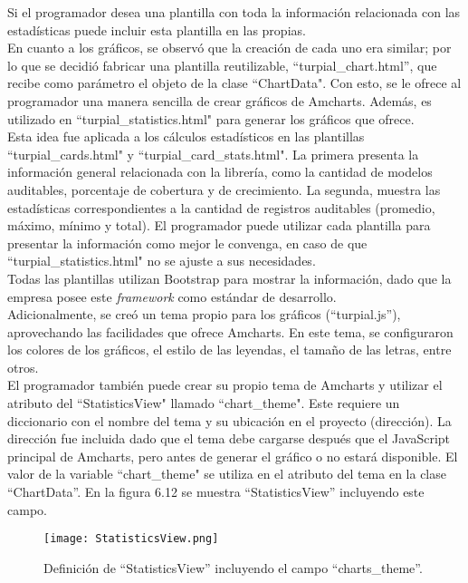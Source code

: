 Si el programador desea una plantilla con toda la información relacionada con las estadísticas puede incluir esta plantilla en las propias.\\

En cuanto a los gráficos, se observó que la creación de cada uno era similar; por lo que se decidió fabricar una plantilla reutilizable, “turpial\_chart.html”, que recibe como parámetro el objeto de la clase “ChartData". Con esto, se le ofrece al programador una manera sencilla de crear gráficos de Amcharts. Además, es utilizado en “turpial\_statistics.html" para generar los gráficos que ofrece. \\

Esta idea fue aplicada a los cálculos estadísticos en las plantillas “turpial\_cards.html" y “turpial\_card\_stats.html". La primera presenta  la información general relacionada con la librería, como la cantidad de modelos auditables, porcentaje de cobertura y de crecimiento. La segunda, muestra las estadísticas correspondientes a la cantidad de registros auditables (promedio, máximo, mínimo y total). El programador puede utilizar cada plantilla para presentar la información como mejor le convenga, en caso de que “turpial\_statistics.html" no se ajuste a sus necesidades.\\

Todas las plantillas utilizan Bootstrap para mostrar la información, dado que la empresa posee este \textit{framework} como estándar de desarrollo.\\

Adicionalmente, se creó un tema propio para los gráficos (“turpial.js”), aprovechando las facilidades que ofrece Amcharts. En este tema, se configuraron los colores de los gráficos, el estilo de las leyendas, el tamaño de las letras, entre otros.\\

El programador también puede crear su propio tema de Amcharts y utilizar el atributo del “StatisticsView" llamado “chart\_theme". Este requiere un diccionario con el nombre del tema y su ubicación en el proyecto (dirección). La dirección fue incluida dado que el tema debe cargarse después que el JavaScript principal de Amcharts, pero antes de generar el gráfico o no estará disponible. El valor de la variable “chart\_theme" se utiliza en el atributo del tema en la clase “ChartData”. En la figura 6.12 se muestra “StatisticsView” incluyendo este campo.\\

\begin{figure}[h]
\centering
\texttt{[image: StatisticsView.png]}
\caption{ Definición de “StatisticsView”  incluyendo el campo “charts\_theme”.}
\label{fig:figura6.12}
\end{figure}

